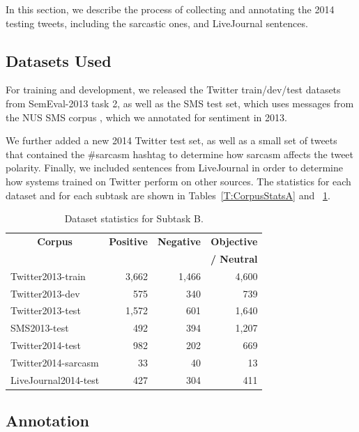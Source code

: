 \documentclass[11pt]{article}
\begin{document}
In this section, we describe the process of collecting and annotating
the 2014 testing tweets, including the sarcastic ones, and LiveJournal sentences.

 \subsection{Datasets Used}

For training and development, we released the Twitter train/dev/test datasets from SemEval-2013 task 2,
as well as the SMS test set, which uses messages from the NUS SMS corpus \cite{SMScorpus},
which we annotated for sentiment in 2013.

We further added a new 2014 Twitter test set, as well as a small set of tweets that contained the \#sarcasm hashtag to determine how sarcasm affects the tweet polarity. Finally, we included sentences from LiveJournal in order to determine how systems trained on Twitter perform on other sources. The statistics for each dataset and for each subtask are shown in Tables~\ref{T:CorpusStatsA} and ~\ref{T:CorpusStatsB}.

\begin{table}[ht]
\small
\begin{center}
\begin{tabular}{|l |r |r | r |}
\hline
\multicolumn{1}{|c|}{\bf Corpus} & \bf Positive & \bf Negative & \bf Objective \\
&  &  & \bf / Neutral \\
\hline
Twitter2013-train & 3,662 & 1,466 &  4,600  \\
Twitter2013-dev & 575 & 340 &  739  \\
Twitter2013-test  & 1,572 & 601 & 1,640  \\
SMS2013-test  & 492 & 394 & 1,207 \\
\hline
Twitter2014-test  & 982 & 202 & 669 \\
Twitter2014-sarcasm & 33 & 40 & 13 \\
LiveJournal2014-test  & 427 & 304 & 411 \\
\hline
\end{tabular}
\caption{Dataset statistics for Subtask B.}
\label{T:CorpusStatsB}
\end{center}
\end{table}

 \subsection{Annotation}
\end{document}
